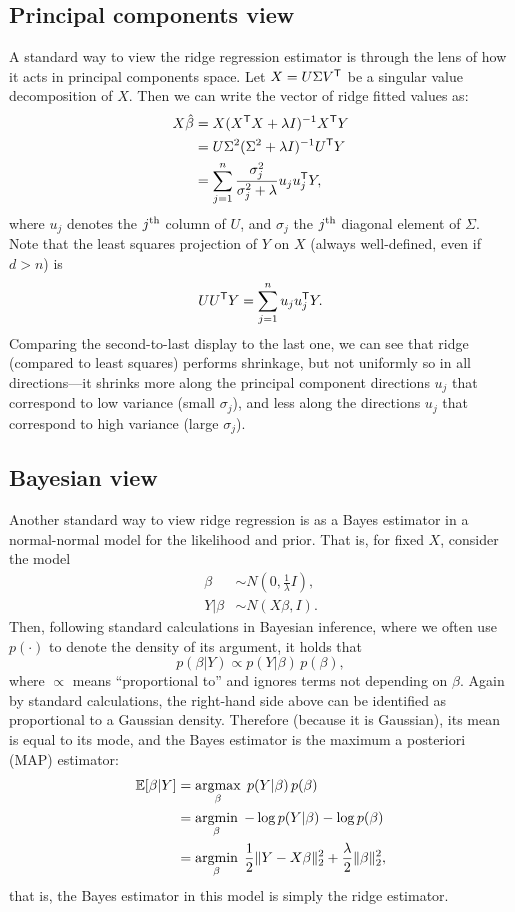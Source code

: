 \documentclass{article}
\begin{document}
\subsection{Principal components view}

A standard way to view the ridge regression estimator is through the lens of how
it acts in principal components space. Let $X = U \Sigma V^{\mathsf{T}}$ be a singular
value decomposition of $X$. Then we can write the vector of ridge fitted values
as: 
\begin{align*}
X\hat{\beta} &= X (X^{\mathsf{T}} X + \lambda I)^{-1} X^{\mathsf{T}} Y \\
&= U \Sigma^2 (\Sigma^2 + \lambda I)^{-1} U^{\mathsf{T}} Y \\ 
&= \sum_{j=1}^n \frac{\sigma_j^2}{\sigma_j^2+\lambda} u_j u_j^{\mathsf{T}} Y,  
\end{align*}
where $u_j$ denotes the $j^{\text{th}}$ column of $U$, and $\sigma_j$ the $j^{\text{th}}$ diagonal 
element of $\Sigma$. Note that the least squares projection of $Y$ on $X$
(always well-defined, even if $d > n$) is
\[
U U^{\mathsf{T}} Y = \sum_{j=1}^n u_j u_j^{\mathsf{T}} Y.
\]
Comparing the second-to-last display to the last one, we can see that ridge 
(compared to least squares) performs shrinkage, but not uniformly so in all 
directions---it shrinks more along the principal component directions $u_j$ that
correspond to low variance (small $\sigma_j$), and less along the directions
$u_j$ that correspond to high variance (large $\sigma_j$).    

\subsection{Bayesian view}

Another standard way to view ridge regression is as a Bayes estimator in a 
normal-normal model for the likelihood and prior. That is, for fixed $X$,
consider the model 
\begin{equation}
\label{eq:normal_bayes}
\begin{aligned}
\beta &\sim N(0, \frac{1}{\lambda} I), \\
Y | \beta &\sim N(X\beta, I).
\end{aligned}
\end{equation}
Then, following standard calculations in Bayesian inference, where we often use
$p(\cdot)$ to denote the density of its argument, it holds that
\[
p(\beta | Y) \propto p(Y | \beta) \, p(\beta),
\]
where $\propto$ means ``proportional to'' and ignores terms not depending on
$\beta$. Again by standard calculations, the right-hand side above can be
identified as proportional to a Gaussian density. Therefore (because it is
Gaussian), its mean is equal to its mode, and the Bayes estimator is the maximum 
a posteriori (MAP) estimator:
\begin{align}
\nonumber
\mathbb{E}[\beta | Y] &= \mathop{\mathrm{argmax}}_\beta \; p(Y | \beta) \, p(\beta) \\
&= \mathop{\mathrm{argmin}}_\beta \; -\log p(Y | \beta) - \log p(\beta) \\
\label{eq:ridge_bayes}
&= \mathop{\mathrm{argmin}}_\beta \; \frac{1}{2} \|Y - X\beta\|_2^2 + \frac{\lambda}{2}
  \|\beta\|_2^2,
\end{align}
that is, the Bayes estimator in this model is simply the ridge estimator. 
\end{document}
